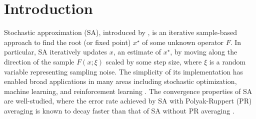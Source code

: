 \section{Introduction}
Stochastic approximation (SA), introduced by \citep{RobbinsMonro}, is an iterative sample-based approach to find the root (or fixed point)  $x^{\star}$  of some unknown operator $F$. 
In particular, SA iteratively updates $x$, an estimate of $x^{\star}$, by moving along the direction of the sample $F(x;\xi)$ scaled by some step size, where $\xi$ is a random variable representing sampling noise. 
The simplicity of its implementation has enabled broad applications in many areas including stochastic optimization, machine learning, and reinforcement learning \citep{SBbook2018,LanBook2020}. 
The convergence properties of SA are well-studied, where the error rate achieved by SA with Polyak-Ruppert (PR) averaging is known to decay faster than that of SA without PR averaging \citep{polyakJuditsky}. 




